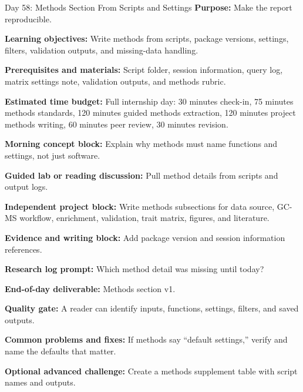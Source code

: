 \begin{dailybox}{Day 58: Methods Section From Scripts and Settings}
\textbf{Purpose:} Make the report reproducible.

\textbf{Learning objectives:} Write methods from scripts, package versions, settings, filters, validation outputs, and missing-data handling.

\textbf{Prerequisites and materials:} Script folder, session information, query log, matrix settings note, validation outputs, and methods rubric.

\textbf{Estimated time budget:} Full internship day: 30 minutes check-in, 75 minutes methods standards, 120 minutes guided methods extraction, 120 minutes project methods writing, 60 minutes peer review, 30 minutes revision.

\textbf{Morning concept block:} Explain why methods must name functions and settings, not just software.

\textbf{Guided lab or reading discussion:} Pull method details from scripts and output logs.

\textbf{Independent project block:} Write methods subsections for data source, GC-MS workflow, enrichment, validation, trait matrix, figures, and literature.

\textbf{Evidence and writing block:} Add package version and session information references.

\textbf{Research log prompt:} Which method detail was missing until today?

\textbf{End-of-day deliverable:} Methods section v1.

\textbf{Quality gate:} A reader can identify inputs, functions, settings, filters, and saved outputs.

\textbf{Common problems and fixes:} If methods say ``default settings,'' verify and name the defaults that matter.

\textbf{Optional advanced challenge:} Create a methods supplement table with script names and outputs.
\end{dailybox}

